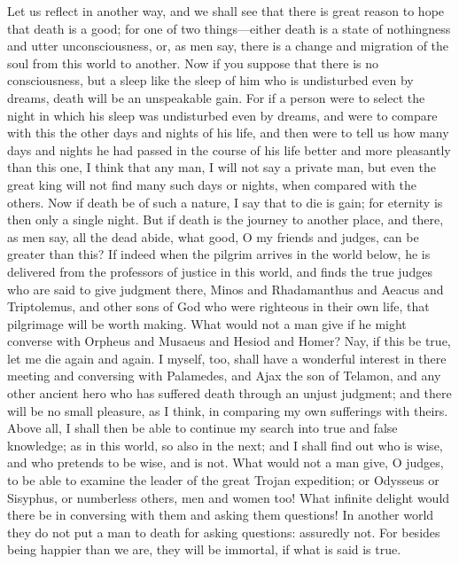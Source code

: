 \documentclass[11pt,letter]{article}
\begin{document}
\par  Let us reflect in another way, and we shall see that there is great reason to hope that death is a good; for one of two things—either death is a state of nothingness and utter unconsciousness, or, as men say, there is a change and migration of the soul from this world to another. Now if you suppose that there is no consciousness, but a sleep like the sleep of him who is undisturbed even by dreams, death will be an unspeakable gain. For if a person were to select the night in which his sleep was undisturbed even by dreams, and were to compare with this the other days and nights of his life, and then were to tell us how many days and nights he had passed in the course of his life better and more pleasantly than this one, I think that any man, I will not say a private man, but even the great king will not find many such days or nights, when compared with the others. Now if death be of such a nature, I say that to die is gain; for eternity is then only a single night. But if death is the journey to another place, and there, as men say, all the dead abide, what good, O my friends and judges, can be greater than this? If indeed when the pilgrim arrives in the world below, he is delivered from the professors of justice in this world, and finds the true judges who are said to give judgment there, Minos and Rhadamanthus and Aeacus and Triptolemus, and other sons of God who were righteous in their own life, that pilgrimage will be worth making. What would not a man give if he might converse with Orpheus and Musaeus and Hesiod and Homer? Nay, if this be true, let me die again and again. I myself, too, shall have a wonderful interest in there meeting and conversing with Palamedes, and Ajax the son of Telamon, and any other ancient hero who has suffered death through an unjust judgment; and there will be no small pleasure, as I think, in comparing my own sufferings with theirs. Above all, I shall then be able to continue my search into true and false knowledge; as in this world, so also in the next; and I shall find out who is wise, and who pretends to be wise, and is not. What would not a man give, O judges, to be able to examine the leader of the great Trojan expedition; or Odysseus or Sisyphus, or numberless others, men and women too! What infinite delight would there be in conversing with them and asking them questions! In another world they do not put a man to death for asking questions: assuredly not. For besides being happier than we are, they will be immortal, if what is said is true.
\end{document}
